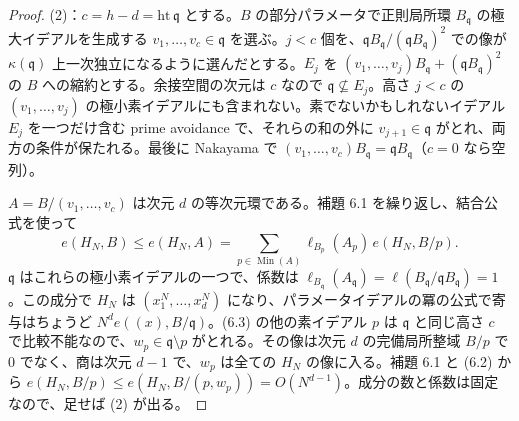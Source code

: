 \documentclass[11pt,a4paper]{ltjsarticle}
\theoremstyle{plain}
\theoremstyle{definition}
\newcommand{\Min}{\operatorname{Min}}
\begin{document}
\begin{proof}
(2)：$c = h-d = \mathrm{ht}\,\mathfrak{q}$ とする。$B$ の部分パラメータで正則局所環 $B_\mathfrak{q}$ の極大イデアルを生成する $v_1,\dots,v_c\in\mathfrak{q}$ を選ぶ。$j<c$ 個を、$\mathfrak{q}B_\mathfrak{q}/(\mathfrak{q}B_\mathfrak{q})^2$ での像が $\kappa(\mathfrak{q})$ 上一次独立になるように選んだとする。$E_j$ を $(v_1,\dots,v_j)B_\mathfrak{q}+(\mathfrak{q}B_\mathfrak{q})^2$ の $B$ への縮約とする。余接空間の次元は $c$ なので $\mathfrak{q}\not\subseteq E_j$。高さ $j<c$ の $(v_1,\dots,v_j)$ の極小素イデアルにも含まれない。素でないかもしれないイデアル $E_j$ を一つだけ含む prime avoidance で、それらの和の外に $v_{j+1}\in\mathfrak{q}$ がとれ、両方の条件が保たれる。最後に Nakayama で $(v_1,\dots,v_c)B_\mathfrak{q} = \mathfrak{q}B_\mathfrak{q}$（$c = 0$ なら空列）。

$A = B/(v_1,\dots,v_c)$ は次元 $d$ の等次元環である。補題 6.1 を繰り返し、結合公式を使って
\begin{equation}\tag{6.3}
  e(H_N,B)\le e(H_N,A) = \sum_{p\in\Min(A)}\ell_{B_p}(A_p)\,e(H_N,B/p).
\end{equation}
$\mathfrak{q}$ はこれらの極小素イデアルの一つで、係数は $\ell_{B_\mathfrak{q}}(A_\mathfrak{q}) = \ell(B_\mathfrak{q}/\mathfrak{q}B_\mathfrak{q}) = 1$。この成分で $H_N$ は $(x_1^N,\dots,x_d^N)$ になり、パラメータイデアルの冪の公式で寄与はちょうど $N^de((x),B/\mathfrak{q})$。(6.3) の他の素イデアル $p$ は $\mathfrak{q}$ と同じ高さ $c$ で比較不能なので、$w_p\in\mathfrak{q}\setminus p$ がとれる。その像は次元 $d$ の完備局所整域 $B/p$ で $0$ でなく、商は次元 $d-1$ で、$w_p$ は全ての $H_N$ の像に入る。補題 6.1 と (6.2) から $e(H_N,B/p)\le e(H_N,B/(p,w_p)) = O(N^{d-1})$。成分の数と係数は固定なので、足せば (2) が出る。
\end{proof}
\end{document}
